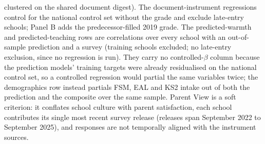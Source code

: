\begin{table}[htbp]
\begin{minipage}{\linewidth}
clustered on the shared document digest). The document-instrument regressions control
for the national control set without the grade and exclude late-entry schools; Panel B
adds the predecessor-filled 2019 grade. The predicted-warmth and predicted-teaching
rows are correlations over every school with an out-of-sample prediction and a
survey (training schools excluded; no late-entry exclusion, since no regression is
run). They carry no controlled-$\beta$ column because the prediction models'
training targets were already residualised on the national control set, so a
controlled regression would partial the same variables twice; the demographics
row instead partials FSM, EAL and KS2 intake out of both the prediction and the
composite over the same sample. 
Parent View is a soft criterion: it conflates school culture with parent
satisfaction, each school contributes its single most recent survey release (releases span
September 2022 to September 2025), and responses are not temporally aligned with the
instrument sources. 
\end{minipage}
\end{table}
